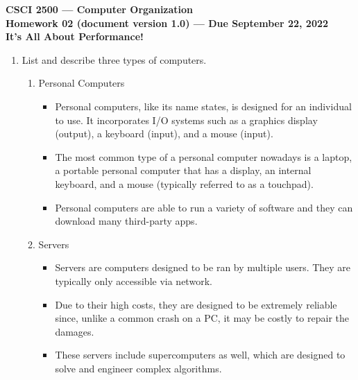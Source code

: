 \documentclass[10pt]{article}
\begin{document}
\begin{center}
    \textbf{CSCI 2500 — Computer Organization\\
    Homework 02 (document version 1.0) — Due September 22, 2022\\
    It’s All About Performance!\\}
\end{center}

\begin{enumerate}
    \item List and describe three types of computers.
    \begin{enumerate}
        \item Personal Computers
        \begin{itemize}
            \item Personal computers, like its name states, is designed for an 
            individual to use. It incorporates I/O systems such as a graphics 
            display (output), a keyboard (input), and a mouse (input). 
            \item The most common type of a personal computer nowadays is a laptop, 
            a portable personal computer that has a display, an internal keyboard, 
            and a mouse (typically referred to as a touchpad).
            \item Personal computers are able to run a variety of software and
            they can download many third-party apps.
        \end{itemize}

        \item Servers
        \begin{itemize}
            \item Servers are computers designed to be ran by multiple users. They are
            typically only accessible via network.
            \item Due to their high costs, they are designed to be extremely reliable since, 
            unlike a common crash on a PC, it may be costly to repair the damages.
            \item These servers include supercomputers as well, which are designed to solve
            and engineer complex algorithms.
        \end{itemize}


\end{enumerate}
\end{enumerate}
\end{document}

